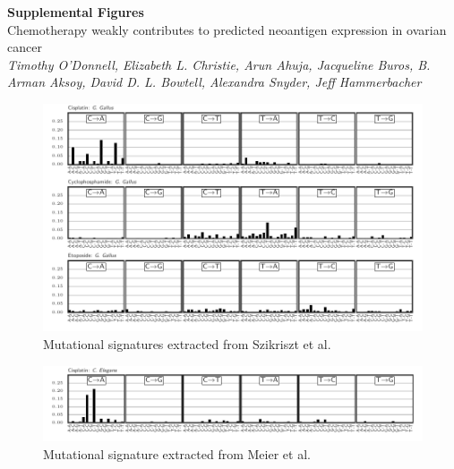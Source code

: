 \documentclass{article}
\begin{document}
\begin{titlepage}
   \begin{center}
      \Large\textbf{Supplemental Figures}\\
      \vspace{1em}
      \Large{Chemotherapy weakly contributes to predicted neoantigen expression in ovarian cancer} \\
      \vspace{1em}
     \large\textit{Timothy O'Donnell, Elizabeth L. Christie, Arun Ahuja, Jacqueline Buros, B. Arman Aksoy, David D. L. Bowtell, Alexandra Snyder, Jeff Hammerbacher}
   \end{center}
\end{titlepage}

\setcounter{equation}{0}
\setcounter{figure}{0}
\setcounter{table}{0}
\makeatletter
\renewcommand{\theequation}{S\arabic{equation}}
\renewcommand{\thefigure}{S\arabic{figure}}

\begin{figure}
\centering
\includegraphics[scale=1.0]{../figures/extracted_signatures_chicken.pdf}
\caption{Mutational signatures extracted from Szikriszt et al.~\cite{Szikriszt_2016}}
\label{fig:supp_extracted_signatures_chicken}
\end{figure}

\begin{figure}
\centering
\includegraphics[scale=1.0]{../figures/extracted_signatures_worm.pdf}
\caption{Mutational signature extracted from Meier et al.~\cite{Meier_2014}}
\label{fig:supp_extracted_signatures_worm}
\end{figure}
\end{document}
